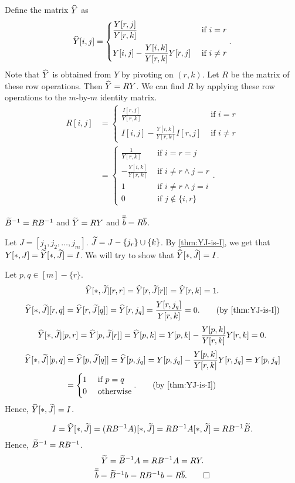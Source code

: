 Define the matrix $\widehat{Y}$ as
\[ \widehat{Y}[i,j] = \begin{cases}
\displaystyle \frac{Y[r,j]}{Y[r,k]} & \textrm{ if } i = r
\\[1em] \displaystyle Y[i,j] - \frac{Y[i,k]}{Y[r,k]}Y[r,j] & \textrm{ if } i \neq r
\end{cases}. \]
Note that $\widehat{Y}$ is obtained from $Y$ by pivoting on $(r, k)$.
Let $R$ be the matrix of these row operations. Then $\widehat{Y} = RY$.
We can find $R$ by applying these row operations to the $m$-by-$m$ identity matrix.
\begin{align*}
R[i,j] &= \begin{cases}
\displaystyle \frac{I[r,j]}{Y[r,k]} & \textrm{ if } i = r
\\[1em] \displaystyle I[i,j] - \frac{Y[i,k]}{Y[r,k]}I[r,j] & \textrm{ if } i \neq r
\end{cases}
\\ &= \begin{cases}
\displaystyle \frac{1}{Y[r,k]} & \textrm{ if } i = r = j
\\[1em] \displaystyle -\frac{Y[i,k]}{Y[r,k]} & \textrm{ if } i \neq r \land j = r
\\ \displaystyle 1 & \textrm{ if } i \neq r \land j = i
\\ \displaystyle 0 & \textrm{ if } j \not\in \{i, r\}
\end{cases}.
\end{align*}

\begin{lemma}
\label{thm:upd-Y}
$\widetilde{B}^{-1} = RB^{-1}$ and $\widetilde{Y} = RY$ and $\overline{\widetilde{b}} = R\overline{b}$.
\end{lemma}
\begin{longProof}
Let $J = [j_1, j_2, \ldots, j_m]$. $\widetilde{J} = J - \{j_r\} \cup \{k\}$.
By \cref{thm:YJ-is-I}, we get that $Y[*,J] = \widetilde{Y}[*,\widetilde{J}] = I$.
We will try to show that $\widehat{Y}[*,\widetilde{J}] = I$.

Let $p, q \in [m] - \{r\}$.
\[ \widehat{Y}[*,\widetilde{J}][r,r] = \widehat{Y}[r,\widetilde{J}[r]] = \widehat{Y}[r,k] = 1. \]
\[ \Yhat[*,\Jtild][r,q] = \Yhat[r,\Jtild[q]] = \Yhat[r,j_q] = \frac{Y[r,j_q]}{Y[r,k]} = 0.
    \tag{by \cref{thm:YJ-is-I}} \]
\[ \widehat{Y}[*,\widetilde{J}][p,r] = \widehat{Y}[p,\widetilde{J}[r]] = \widehat{Y}[p,k]
    = Y[p,k] - \frac{Y[p,k]}{Y[r,k]}Y[r,k] = 0. \]
\begin{align*}
\Yhat[*,\Jtild][p,q] &= \Yhat[p,\Jtild[q]] = \Yhat[p,j_q]
= Y[p,j_q] - \frac{Y[p,k]}{Y[r,k]}Y[r,j_q] = Y[p,j_q]
\\ &= \begin{cases}1 & \textrm{ if } p = q \\ 0 & \textrm{ otherwise}\end{cases}.
\tag{by \cref{thm:YJ-is-I}}
\end{align*}
Hence, $\widehat{Y}[*,\widetilde{J}] = I$.

\[ I = \widehat{Y}[*,\widetilde{J}] = (RB^{-1}A)[*,\widetilde{J}] = RB^{-1}A[*,\widetilde{J}] = RB^{-1}\widetilde{B}. \]
Hence, $\widetilde{B}^{-1} = RB^{-1}$.
\[ \widetilde{Y} = \widetilde{B}^{-1}A = RB^{-1}A = RY. \]
\[ \overline{\widetilde{b}} = \widetilde{B}^{-1}b = RB^{-1}b = R\overline{b}. \qedhere \]
\end{longProof}

